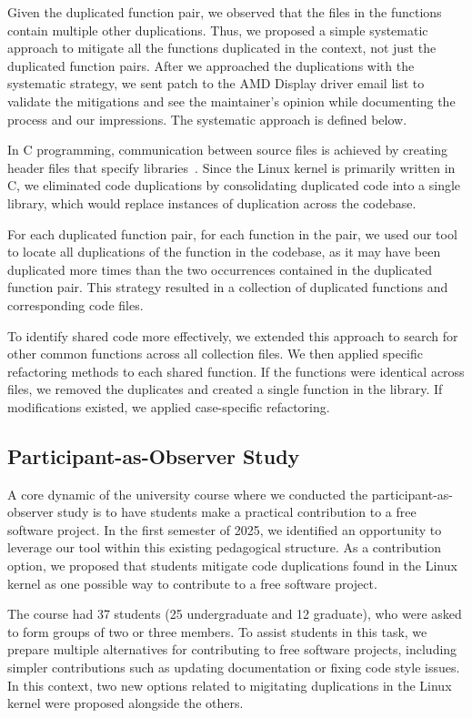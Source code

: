 \documentclass[10pt,conference]{IEEEtran}
\begin{document}
Given the duplicated function pair, we observed that the files in the functions
contain multiple other duplications. Thus, we proposed a simple systematic approach 
to mitigate all the functions duplicated in the context, not just the duplicated 
function pairs. 
After we approached the duplications with the systematic strategy, we sent patch to the 
AMD Display driver email list to validate the mitigations and see the maintainer's opinion 
while documenting the process and our impressions.
The systematic approach is defined below. 

In C programming, communication between source files is achieved by creating header files that specify 
libraries~\cite{Cbook}. Since the Linux kernel is primarily written in C, we eliminated code duplications 
by consolidating duplicated code into a single library, which would replace instances of 
duplication across the codebase.

For each duplicated function pair, for each function in the pair, we used our tool to locate all duplications of the function in the codebase, as it may have been duplicated more times than the two occurrences contained in the duplicated function pair. 
This strategy resulted in a collection of duplicated functions and corresponding code files.

To identify shared code more effectively, we extended this approach to search for other common 
functions across all collection files. We then applied specific refactoring methods to each shared 
function. If the functions were identical across files, we removed the duplicates and created a single 
function in the library. If modifications existed, we applied case-specific refactoring.

\subsection{Participant-as-Observer Study}

A core dynamic of the university course where we conducted the participant-as-observer study is to have students make a practical contribution to a free software project. In the first semester of 2025, we identified an opportunity to leverage our tool within this existing pedagogical structure. As a contribution option, we proposed that students mitigate code duplications found in the Linux kernel as one possible way to contribute to a free software project.

The course had 37 students (25 undergraduate and 12 graduate), who were asked to form groups of 
two or three members. To assist students in this task, we prepare multiple 
alternatives for contributing to free software projects, including simpler contributions such as 
updating documentation or fixing code style issues. In this context, two new options related to migitating
duplications in the Linux kernel were proposed alongside the others.
\end{document}

